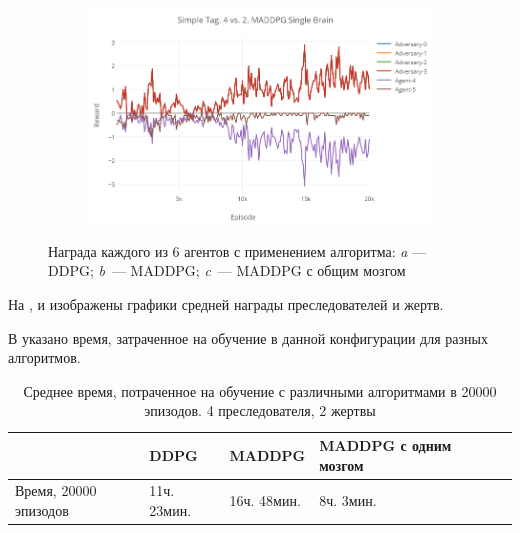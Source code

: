 \begin{figure}[!htbp]
    \begin{subfigure}[t]{\dimexpr.5\linewidth-1.3em\relax}%
        \includegraphics[height=0.20\textheight,valign=t]{my_folder/images/ch5/st-4vs2-maddpg-sb.png}%
    \end{subfigure}
    \captionsetup{justification=centering} %
    \caption{Награда каждого из 6 агентов с применением алгоритма: {\itshape a} --- DDPG; {\itshape b}~--- MADDPG; {\itshape c}~--- MADDPG с общим мозгом}\label{fig:spbpu_main_bld-two-photos}
\end{figure}

На ,  и  изображены графики средней награды преследователей и жертв.

В  указано время, затраченное на обучение в данной конфигурации для разных алгоритмов.

\begin{table}[t!]
    \centering\small
    \caption{Среднее время, потраченное на обучение с различными алгоритмами в 20000 эпизодов. 4 преследователя, 2 жертвы}
    \label{tab-st-4vs2-time}
    \begin{tabular}{|l|l|l|l|l|l|}
        \hline
        & DDPG        & MADDPG      & MADDPG с одним мозгом \\
        \hline
        Время, 20000 эпизодов & 11ч. 23мин. & 16ч. 48мин. & 8ч. 3мин.             \\ \hline
    \end{tabular}
    \normalsize%
\end{table}

